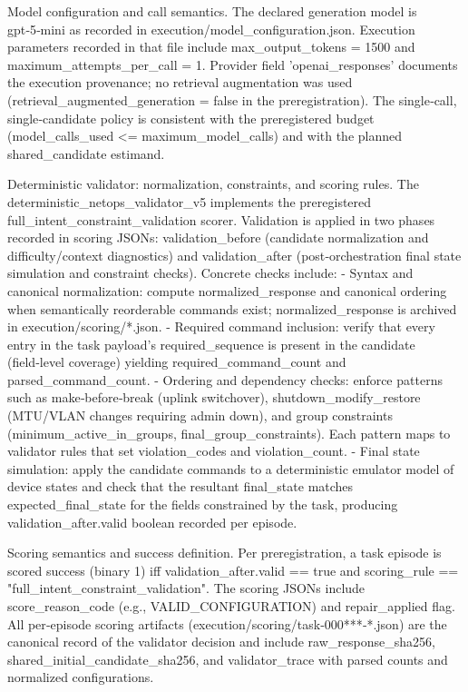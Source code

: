 \documentclass[conference]{IEEEtran}
\begin{document}
Model configuration and call semantics. The declared generation model is gpt‑5‑mini as recorded in execution/model\_configuration.json. Execution parameters recorded in that file include max\_output\_tokens = 1500 and maximum\_attempts\_per\_call = 1. Provider field 'openai\_responses' documents the execution provenance; no retrieval augmentation was used (retrieval\_augmented\_generation = false in the preregistration). The single‑call, single‑candidate policy is consistent with the preregistered budget (model\_calls\_used <= maximum\_model\_calls) and with the planned shared\_candidate estimand.

Deterministic validator: normalization, constraints, and scoring rules. The deterministic\_netops\_validator\_v5 implements the preregistered full\_intent\_constraint\_validation scorer. Validation is applied in two phases recorded in scoring JSONs: validation\_before (candidate normalization and difficulty/context diagnostics) and validation\_after (post‑orchestration final state simulation and constraint checks). Concrete checks include:
- Syntax and canonical normalization: compute normalized\_response and canonical ordering when semantically reorderable commands exist; normalized\_response is archived in execution/scoring/*.json.
- Required command inclusion: verify that every entry in the task payload's required\_sequence is present in the candidate (field‑level coverage) yielding required\_command\_count and parsed\_command\_count.
- Ordering and dependency checks: enforce patterns such as make‑before‑break (uplink switchover), shutdown\_modify\_restore (MTU/VLAN changes requiring admin down), and group constraints (minimum\_active\_in\_groups, final\_group\_constraints). Each pattern maps to validator rules that set violation\_codes and violation\_count.
- Final state simulation: apply the candidate commands to a deterministic emulator model of device states and check that the resultant final\_state matches expected\_final\_state for the fields constrained by the task, producing validation\_after.valid boolean recorded per episode.

Scoring semantics and success definition. Per preregistration, a task episode is scored success (binary 1) iff validation\_after.valid == true and scoring\_rule == "full\_intent\_constraint\_validation". The scoring JSONs include score\_reason\_code (e.g., VALID\_CONFIGURATION) and repair\_applied flag. All per‑episode scoring artifacts (execution/scoring/task‑000***‑*.json) are the canonical record of the validator decision and include raw\_response\_sha256, shared\_initial\_candidate\_sha256, and validator\_trace with parsed counts and normalized configurations.
\end{document}
